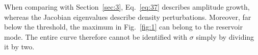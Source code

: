 \documentclass[12pt,a4paper]{article}
\begin{document}
When comparing with Section~\ref{sec:3}, Eq.~\eqref{eq:37} describes amplitude growth, whereas the Jacobian eigenvalues describe density perturbations. Moreover, far below the threshold, the maximum in Fig.~\ref{fig:1} can belong to the reservoir mode. The entire curve therefore cannot be identified with $\sigma$ simply by dividing it by two.
\clearpage

\end{document}
